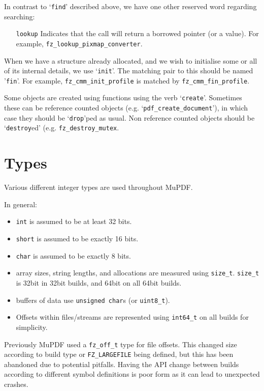 \documentclass[oneside]{book}
\begin{document}
In contrast to `\texttt{find}' described above, we have one other reserved word regarding searching:

\begin{itemize}
\item[\texttt{lookup}] Indicates that the call will return a borrowed pointer (or a value). For example, \texttt{fz\_lookup\_pixmap\_converter}.
\end{itemize}

When we have a structure already allocated, and we wish to initialise some or all of its internal details, we use `\texttt{init}'. The matching pair to this should be named '\texttt{fin}'. For example, \texttt{fz\_cmm\_init\_profile} is matched by \texttt{fz\_cmm\_fin\_profile}.

Some objects are created using functions using the verb `\texttt{create}'. Sometimes these can be reference counted objects (e.g. `\texttt{pdf\_create\_document}'), in which case they should be `\texttt{drop}'ped as usual. Non reference counted objects should be `\texttt{destroy}ed' (e.g. \texttt{fz\_destroy\_mutex}.

\section{Types}

Various different integer types are used throughout MuPDF.

In general:

\begin{itemize}
\item \texttt{int} is assumed to be at least 32 bits.
\item \texttt{short} is assumed to be exactly 16 bits.
\item \texttt{char} is assumed to be exactly 8 bits.
\item array sizes, string lengths, and allocations are measured using \texttt{size\_t}. \texttt{size\_t} is 32bit in 32bit builds, and 64bit on all 64bit builds.
\item buffers of data use \texttt{unsigned char}s (or \texttt{uint8\_t}).
\item Offsets within files/streams are represented using \texttt{int64\_t} on all builds for simplicity.
\end{itemize}

Previously MuPDF used a \texttt{fz\_off\_t} type for file offsets. This changed size according to build type or \texttt{FZ\_LARGEFILE} being defined, but this has been abandoned due to potential pitfalls. Having the API change between builds according to different symbol definitions is poor form as it can lead to unexpected crashes.
\end{document}
